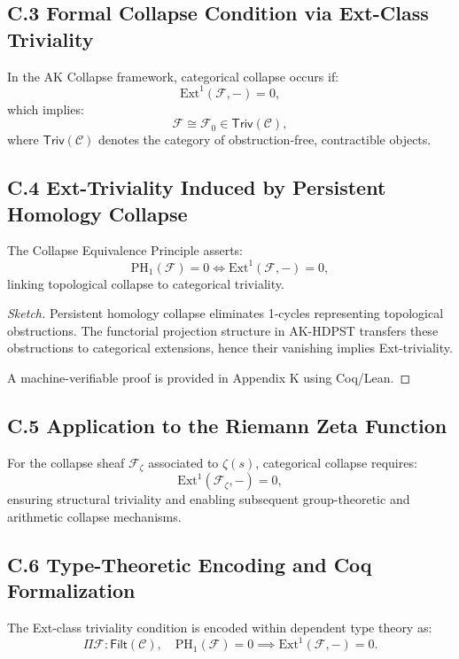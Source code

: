 \documentclass[11pt]{article}
\begin{document}
\subsection*{C.3 Formal Collapse Condition via Ext-Class Triviality}

In the AK Collapse framework, categorical collapse occurs if:
\[
\mathrm{Ext}^1(\mathcal{F}, -) = 0,
\]
which implies:
\[
\mathcal{F} \cong \mathcal{F}_0 \in \mathsf{Triv}(\mathcal{C}),
\]
where $\mathsf{Triv}(\mathcal{C})$ denotes the category of obstruction-free, contractible objects.

\subsection*{C.4 Ext-Triviality Induced by Persistent Homology Collapse}

The Collapse Equivalence Principle asserts:
\[
\mathrm{PH}_1(\mathcal{F}) = 0 \iff \mathrm{Ext}^1(\mathcal{F}, -) = 0,
\]
linking topological collapse to categorical triviality.

\begin{proof}[Sketch]
Persistent homology collapse eliminates 1-cycles representing topological obstructions. The functorial projection structure in AK-HDPST transfers these obstructions to categorical extensions, hence their vanishing implies Ext-triviality.

A machine-verifiable proof is provided in Appendix K using Coq/Lean.
\end{proof}

\subsection*{C.5 Application to the Riemann Zeta Function}

For the collapse sheaf $\mathcal{F}_{\zeta}$ associated to $\zeta(s)$, categorical collapse requires:
\[
\mathrm{Ext}^1(\mathcal{F}_{\zeta}, -) = 0,
\]
ensuring structural triviality and enabling subsequent group-theoretic and arithmetic collapse mechanisms.

\subsection*{C.6 Type-Theoretic Encoding and Coq Formalization}

The Ext-class triviality condition is encoded within dependent type theory as:
\[
\Pi \mathcal{F} : \mathsf{Filt}(\mathcal{C}), \quad \mathrm{PH}_1(\mathcal{F}) = 0 \implies \mathrm{Ext}^1(\mathcal{F}, -) = 0.
\]
\end{document}
